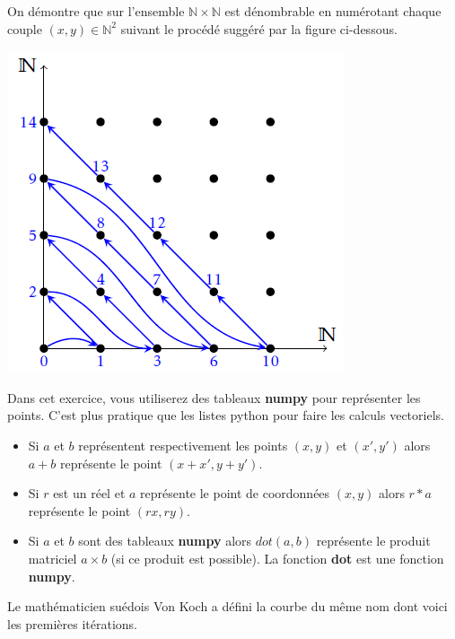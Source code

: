 \documentclass[t,10pt]{article}
\begin{document}





On démontre que sur l'ensemble $\mathbb{N}\times \mathbb{N}$ est dénombrable en numérotant chaque couple $(x,y)\in\mathbb{N}^2$ suivant le procédé suggéré par la figure ci-dessous.

\begin{center}
\includegraphics[width=.2\linewidth]{fig_01}
\end{center}







Dans cet exercice, vous utiliserez des tableaux \textbf{numpy} pour représenter les points. C'est plus pratique que les 
listes python pour faire les calculs vectoriels.

\begin{itemize}
\item Si $a$ et $b$ représentent respectivement les points $(x,y)$ et $(x',y')$ alors $a+b$ représente le point 
$(x+x',y+y')$.
\item Si $r$ est un réel et $a$ représente le point de coordonnées $(x,y)$ alors $r*a$ représente le point $(rx,ry)$.
\item Si $a$ et $b$ sont des tableaux \textbf{numpy} alors $dot(a,b)$ représente le produit matriciel $a\times b$ (si ce 
produit est possible). La fonction \textbf{dot} est une fonction \textbf{numpy}.
\end{itemize}

Le mathématicien suédois Von Koch a défini la courbe du même nom dont voici les premières itérations.
\end{document}
